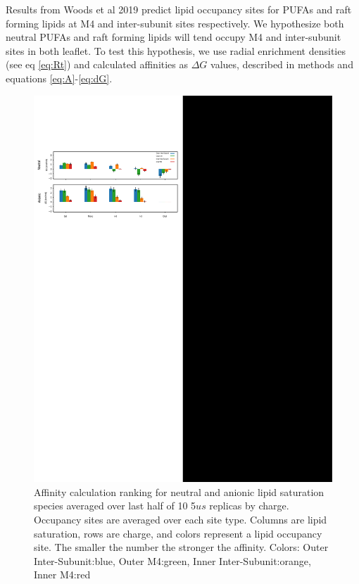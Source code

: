 \documentclass[preprint,3p,9pt,times,onecolumn]{elsarticle}
\begin{document}
Results from Woods et al 2019 \cite{Woods2019} predict lipid occupancy sites for PUFAs and raft forming lipids at M4 and inter-subunit sites respectively. We hypothesize both neutral PUFAs and raft forming lipids will tend occupy M4 and inter-subunit sites in both leaflet. To test this hypothesis, we use radial enrichment densities (see eq \ref{eq:Rt}) and calculated affinities as $\Delta G$ values, described in methods and equations \ref{eq:A}-\ref{eq:dG}.

\begin{figure}[!h]
	\center
	\includegraphics[width=\linewidth]{Protein_centric.pdf}
	\caption{Affinity calculation ranking for neutral and anionic lipid saturation species averaged over last half of 10 5$us$ replicas by charge. Occupancy sites are averaged over each site type. Columns are lipid saturation, rows are charge, and colors represent a lipid occupancy site. The smaller the number the stronger the affinity.  Colors: Outer Inter-Subunit:blue, Outer M4:green, Inner Inter-Subunit:orange, Inner M4:red}
	\label{fig:proBar}
\end{figure}
\end{document}
